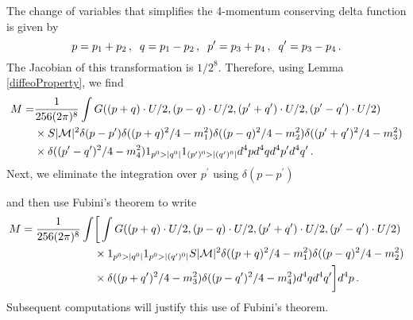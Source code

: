The change of variables that simplifies the 4-momentum conserving delta function is given by
\begin{equation}
p=p_1+p_2\,,\hspace{2mm} q=p_1-p_2\,, \hspace{2mm} p^{\prime}=p_3+p_4\,, \hspace{2mm} q^{\prime}=p_3-p_4\,.
\end{equation}
The Jacobian of this transformation is $1/2^{8}$.  Therefore, using Lemma \ref{diffeoProperty}, we find
\begin{align}\label{Meq1}
M=&\frac{1}{256(2\pi)^8 }\int   G((p+q)\cdot U/2,(p-q)\cdot  U/2,(p^{\prime}+q^{\prime})\cdot U/2, (p^{\prime}-q^{\prime})\cdot U/2)\notag\\ 
&\times S |\mathcal{M}|^2  \delta(p-p^{\prime})\delta((p+q)^2/4-m_1^2)\delta((p-q)^2/4-m_2^2)\delta((p^{\prime}+q^{\prime})^2/4-m_3^2)\notag\\
&\times\delta((p^{\prime}-q^{\prime})^2/4-m_4^2)1_{p^0>|q^0|} 1_{(p^{\prime})^0>|(q^{\prime})^0|}d^4pd^4qd^4p^{\prime}d^4q^{\prime}\,.
\end{align}
Next, we eliminate the integration over $p^{\prime}$ using $\delta(p-p^{\prime})$
 \begin{comment} 
using associative property
\end{comment}
 and then use Fubini's theorem to write
\begin{align}\label{useFubini}
M=\frac{1}{256(2\pi)^8 }\int &\bigg[ \int G((p+q)\cdot U/2,(p-q)\cdot  U/2,(p^{\prime}+q^{\prime})\cdot U/2, (p^{\prime}-q^{\prime})\cdot U/2)\notag\\ 
&\times  1_{p^0>|q^0|} 1_{p^0>|(q^{\prime})^0|}S |\mathcal{M}|^2 \delta((p+q)^2/4-m_1^2)\delta((p-q)^2/4-m_2^2)\notag\\
&\times \delta((p+q^{\prime})^2/4-m_3^2)\delta((p-q^{\prime})^2/4-m_4^2)d^4qd^4q^{\prime}\bigg]d^4p\,.
\end{align}
Subsequent computations will justify this use of Fubini's theorem.


